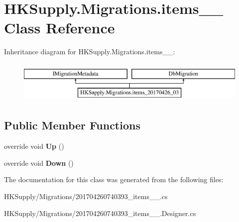 \hypertarget{class_h_k_supply_1_1_migrations_1_1items__20170426__03}{}\section{H\+K\+Supply.\+Migrations.\+items\+\_\+\_ Class Reference}
\label{class_h_k_supply_1_1_migrations_1_1items__20170426__03}
Inheritance diagram for H\+K\+Supply.\+Migrations.\+items\+\_\+\_\+:\begin{figure}[H]
\begin{center}
\leavevmode
\includegraphics[height=2.000000cm]{class_h_k_supply_1_1_migrations_1_1items__20170426__03}
\end{center}
\end{figure}
\subsection*{Public Member Functions}
\begin{DoxyCompactItemize}
\item 
\mbox{\label{class_h_k_supply_1_1_migrations_1_1items__20170426__03_a38b483db76204c32c8c2c2ade25c7adc}} 
override void {\bfseries Up} ()
\item 
\mbox{\label{class_h_k_supply_1_1_migrations_1_1items__20170426__03_ab54f26447b6e109fd592a29f20d92489}} 
override void {\bfseries Down} ()
\end{DoxyCompactItemize}


The documentation for this class was generated from the following files\+:\begin{DoxyCompactItemize}
\item 
H\+K\+Supply/\+Migrations/201704260740393\+\_\+items\+\_\+\_.\+cs\item 
H\+K\+Supply/\+Migrations/201704260740393\+\_\+items\+\_\+\_.\+Designer.\+cs\end{DoxyCompactItemize}
